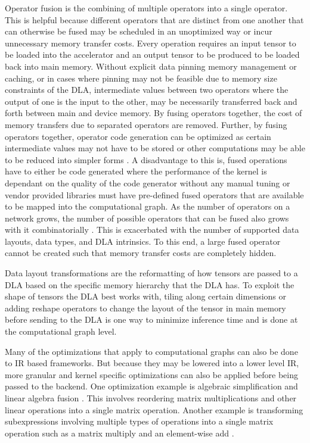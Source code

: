 Operator fusion is the combining of multiple operators into a single operator.
This is helpful because different operators that are distinct from one another
that can otherwise be fused may be scheduled in an unoptimized way or incur
unnecessary memory transfer costs. Every operation requires an input tensor to
be loaded into the accelerator and an output tensor to be produced to be loaded
back into main memory. Without explicit data pinning memory management or
caching, or in cases where pinning may not be feasible due to memory size
constraints of the DLA, intermediate values between two operators where the
output of one is the input to the other, may be necessarily transferred back
and forth between main and device memory. By fusing operators together,
the cost of memory transfers due to separated operators are removed.
Further, by fusing operators together, operator code generation can
be optimized as certain intermediate values may not have to be stored or other
computations may be able to be reduced into simpler forms \cite{TVM} \cite{ONNX}.
A disadvantage to this is, fused operations have to either be code generated
where the performance of the kernel is dependant on the quality of the code
generator without any manual tuning or vendor provided libraries must have
pre-defined fused operators that are available to be mapped into the computational
graph. As the number of operators on a network grows, the number of possible
operators that can be fused also grows with it combinatorially \cite{TVM}.
This is exacerbated with the number of supported data layouts, data types, 
and DLA intrinsics. To this end, a large fused operator
cannot be created such that memory transfer costs are completely hidden.

Data layout transformations are the reformatting of how tensors are passed
to a DLA based on the specific memory hierarchy that the DLA has. To exploit
the shape of tensors the DLA best works with, tiling along certain dimensions or
adding reshape operators to change the layout of the tensor in main memory before
sending to the DLA is one way to minimize inference time and is done at the
computational graph level.

Many of the optimizations that apply to computational graphs can also be done
to IR based frameworks. But because they may be lowered into a lower level IR,
more granular and kernel specific optimizations can also be applied before
being passed to the backend. One optimization example is algebraic
simplification and linear algebra fusion \cite{DLVM}. This involves reordering
matrix multiplications and other linear operations into a single matrix
operation. Another example is transforming subexpressions involving multiple
types of operations into a single matrix operation such as a matrix multiply
and an element-wise add \cite{DLVM}.


